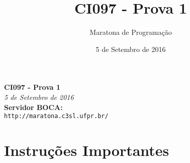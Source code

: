 \documentclass[12pt,oneside]{article} %
\title{CI097 - Prova 1}
\author{Maratona de Programação}
\date{5 de Setembro de 2016}
\begin{document}
\begin{center}
\textbf{\Huge CI097 - Prova 1}\\
\vspace{0.2cm}
\textit{5 de Setembro de 2016} \\
\vspace{1.0cm}
\textbf{Servidor BOCA:} \\
\texttt{\large http://maratona.c3sl.ufpr.br/} \\
\vspace{1.0cm}
\end{center}

\pagestyle{fancy}
\renewcommand{\footrulewidth}{0.7pt}
\renewcommand{\headrulewidth}{0.7pt}
\cfoot{\thepage}


  \section*{Instruções Importantes}
\end{document}
